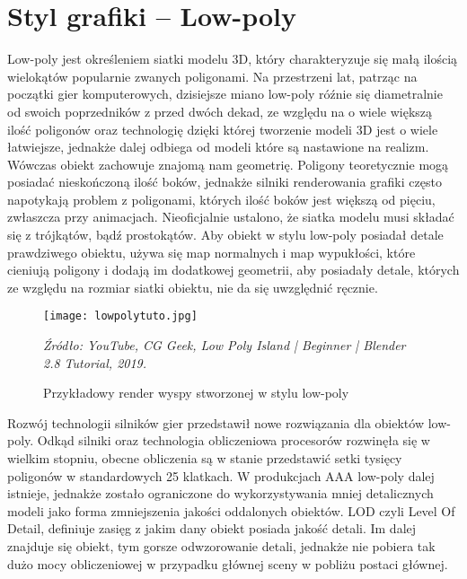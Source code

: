 \section{Styl grafiki -- Low-poly}

\indent Low-poly jest określeniem siatki modelu 3D, który charakteryzuje się małą ilością wielokątów popularnie zwanych poligonami. Na przestrzeni lat, patrząc na początki gier komputerowych, dzisiejsze miano low-poly róźnie się diametralnie od swoich poprzedników z przed dwóch dekad, ze względu na o wiele większą ilość poligonów oraz technologię dzięki której tworzenie modeli 3D jest o wiele łatwiejsze, jednakże dalej odbiega od modeli które są nastawione na realizm. Wówczas obiekt zachowuje znajomą nam geometrię. Poligony teoretycznie mogą posiadać nieskończoną ilość boków, jednakże silniki renderowania grafiki często napotykają problem z poligonami, których ilość boków jest większą od pięciu, zwłaszcza przy animacjach. Nieoficjalnie ustalono, że siatka modelu musi składać się z trójkątów, bądź prostokątów. Aby obiekt w stylu low-poly posiadał detale prawdziwego obiektu, używa się map normalnych i map wypukłości, które cieniują poligony i dodają im dodatkowej geometrii, aby posiadały detale, których ze względu na rozmiar siatki obiektu, nie da się uwzględnić ręcznie. 


\begin{figure}[hbt!]
\centering
  \texttt{[image: lowpolytuto.jpg]}
  \caption{Przykładowy render wyspy stworzonej w stylu low-poly}\label{rys_1}
  \begin{minipage}[t]{0.75\linewidth}
    \emph{Źródło: YouTube, CG Geek, Low Poly Island | Beginner | Blender 2.8 Tutorial, 2019.}
  \end{minipage}
\end{figure}


\indent Rozwój technologii silników gier przedstawił nowe rozwiązania dla obiektów low-poly. Odkąd silniki oraz technologia obliczeniowa procesorów rozwinęła się w wielkim stopniu, obecne obliczenia są w stanie przedstawić setki tysięcy poligonów w standardowych 25 klatkach. 
\newpage
W produkcjach AAA low-poly  dalej istnieje, jednakże zostało ograniczone do wykorzystywania mniej detalicznych modeli jako forma zmniejszenia jakości oddalonych obiektów. LOD czyli Level Of Detail, definiuje zasięg z jakim dany obiekt posiada jakość detali. Im dalej znajduje się obiekt, tym gorsze odwzorowanie detali, jednakże nie pobiera tak dużo mocy obliczeniowej w przypadku głównej sceny w pobliżu postaci głównej. \cite{1}

